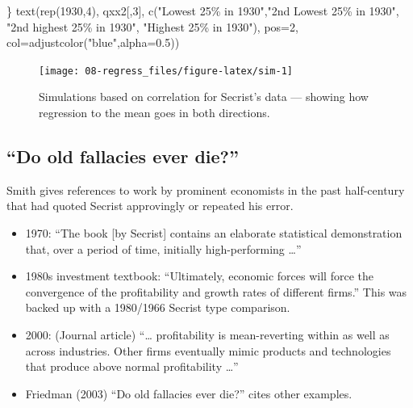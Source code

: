 \documentclass[
  10pt,
  b5paper]{book}
\newenvironment{Shaded}{\begin{snugshade}}{\end{snugshade}}
\newcommand{\AttributeTok}[1]{\textcolor[rgb]{0.77,0.63,0.00}{#1}}
\newcommand{\DecValTok}[1]{\textcolor[rgb]{0.00,0.00,0.81}{#1}}
\newcommand{\FloatTok}[1]{\textcolor[rgb]{0.00,0.00,0.81}{#1}}
\newcommand{\FunctionTok}[1]{\textcolor[rgb]{0.00,0.00,0.00}{#1}}
\newcommand{\NormalTok}[1]{#1}
\newcommand{\StringTok}[1]{\textcolor[rgb]{0.31,0.60,0.02}{#1}}
\providecommand{\tightlist}{%
  \setlength{\itemsep}{0pt}\setlength{\parskip}{0pt}}
\begin{document}
\begin{Shaded}
\begin{Highlighting}[]
\NormalTok{\}}
\FunctionTok{text}\NormalTok{(}\FunctionTok{rep}\NormalTok{(}\DecValTok{1930}\NormalTok{,}\DecValTok{4}\NormalTok{), qxx2[,}\DecValTok{3}\NormalTok{], }\FunctionTok{c}\NormalTok{(}\StringTok{"Lowest 25\% in 1930"}\NormalTok{,}\StringTok{"2nd Lowest 25\% in 1930"}\NormalTok{,}
                             \StringTok{"2nd highest 25\% in 1930"}\NormalTok{, }\StringTok{"Highest 25\% in 1930"}\NormalTok{),}
     \AttributeTok{pos=}\DecValTok{2}\NormalTok{, }\AttributeTok{col=}\FunctionTok{adjustcolor}\NormalTok{(}\StringTok{"blue"}\NormalTok{,}\AttributeTok{alpha=}\FloatTok{0.5}\NormalTok{))   }
\end{Highlighting}
\end{Shaded}

\begin{figure}[H]
\texttt{[image: 08-regress\_files/figure-latex/sim-1]} \caption{Simulations based on correlation for Secrist's data --- 
               showing how regression to the mean goes in both directions.}\label{fig:sim}
\end{figure}

\hypertarget{do-old-fallacies-ever-die}{%
\subsection*{``Do old fallacies ever die?''}\label{do-old-fallacies-ever-die}}

Smith gives references to work by prominent economists in the past
half-century that had quoted Secrist approvingly or repeated his error.

\begin{itemize}
\tightlist
\item
  1970: ``The book {[}by Secrist{]} contains an elaborate statistical
  demonstration that, over a period of time, initially high-performing \ldots{}''
\item
  1980s investment textbook: ``Ultimately, economic forces will force
  the convergence of the profitability and growth rates of different firms.''
  This was backed up with a 1980/1966 Secrist type comparison.
\item
  2000: (Journal article) ``\ldots{} profitability is mean-reverting within
  as well as across industries. Other firms eventually mimic products
  and technologies that produce above normal profitability \ldots{}''
\item
  Friedman (2003) ``Do old fallacies ever die?'' cites other examples.
\end{itemize}
\end{document}
